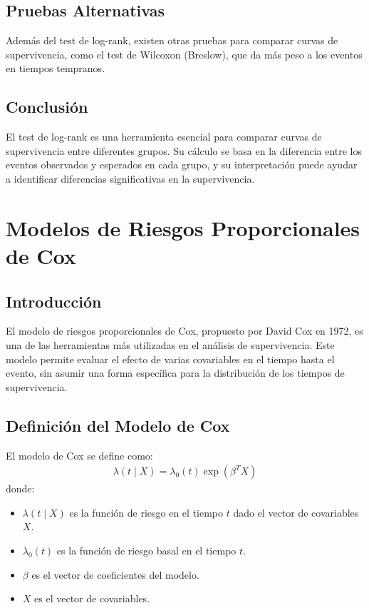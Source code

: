 \documentclass[a4paper]{report} %
\begin{document}
\section{Pruebas Alternativas}
Adem\'as del test de log-rank, existen otras pruebas para comparar curvas de supervivencia, como el test de Wilcoxon (Breslow), que da m\'as peso a los eventos en tiempos tempranos.

\section{Conclusi\'on}
El test de log-rank es una herramienta esencial para comparar curvas de supervivencia entre diferentes grupos. Su c\'alculo se basa en la diferencia entre los eventos observados y esperados en cada grupo, y su interpretaci\'on puede ayudar a identificar diferencias significativas en la supervivencia.



\chapter{Modelos de Riesgos Proporcionales de Cox}

\section{Introducci\'on}
El modelo de riesgos proporcionales de Cox, propuesto por David Cox en 1972, es una de las herramientas más utilizadas en el análisis de supervivencia. Este modelo permite evaluar el efecto de varias covariables en el tiempo hasta el evento, sin asumir una forma espec\'ifica para la distribuci\'on de los tiempos de supervivencia.

\section{Definici\'on del Modelo de Cox}
El modelo de Cox se define como:
\begin{eqnarray*}
\lambda(t \mid X) = \lambda_0(t) \exp(\beta^T X)
\end{eqnarray*}
donde:
\begin{itemize}
    \item $\lambda(t \mid X)$ es la funci\'on de riesgo en el tiempo $t$ dado el vector de covariables $X$.
    \item $\lambda_0(t)$ es la funci\'on de riesgo basal en el tiempo $t$.
    \item $\beta$ es el vector de coeficientes del modelo.
    \item $X$ es el vector de covariables.
\end{itemize}
\end{document}
